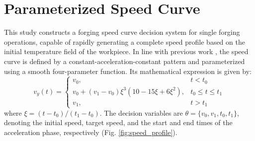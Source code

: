 \section{Parameterized Speed Curve}
\label{sec:speed}


This study constructs a forging speed curve decision system for single
forging operations, capable of rapidly generating a complete speed
profile based on the initial temperature field of the workpiece. In line
with previous work \cite{lin2011critical}, the speed curve is defined
by a constant-acceleration-constant pattern and parameterized using a
smooth four-parameter function.
Its mathematical expression is given by:
\begin{equation}
v_{y}(t)=\begin{cases}
v_{0}, & t<t_{0} \\
v_{0}+\left(v_{1}-v_{0}\right)\xi^{3}\left(10-15\xi+6\xi^{2}\right), & t_{0}\leq t\leq t_{1} \\
v_{1}, & t>t_{1}
\end{cases}
\end{equation}
where $\xi=(t-t_0)/(t_1-t_0)$. The decision variables are
$\theta=\{v_0, v_1, t_0, t_1\}$, denoting the initial speed, target
speed, and the start and end times of the acceleration phase,
respectively (Fig. \ref{fig:speed_profile}).

